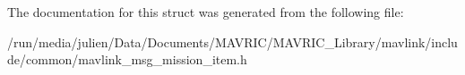 The documentation for this struct was generated from the following file\+:\begin{DoxyCompactItemize}
\item 
/run/media/julien/\+Data/\+Documents/\+M\+A\+V\+R\+I\+C/\+M\+A\+V\+R\+I\+C\+\_\+\+Library/mavlink/include/common/mavlink\+\_\+msg\+\_\+mission\+\_\+item.\+h\end{DoxyCompactItemize}
